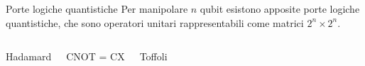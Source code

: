 \documentclass{beamer}
\begin{document}
    \begin{frame}{Porte logiche quantistiche}
        Per manipolare $n$ qubit esistono apposite porte logiche quantistiche, 
        che sono operatori unitari rappresentabili come matrici $2^n\times2^n$. 
        
        \begin{columns}
            \begin{center}
                Hadamard
            \end{center}
            \begin{center}
                CNOT = CX
            \end{center}
            \begin{center}
                Toffoli
            \end{center}
        \end{columns}


\end{frame}
\end{document}
